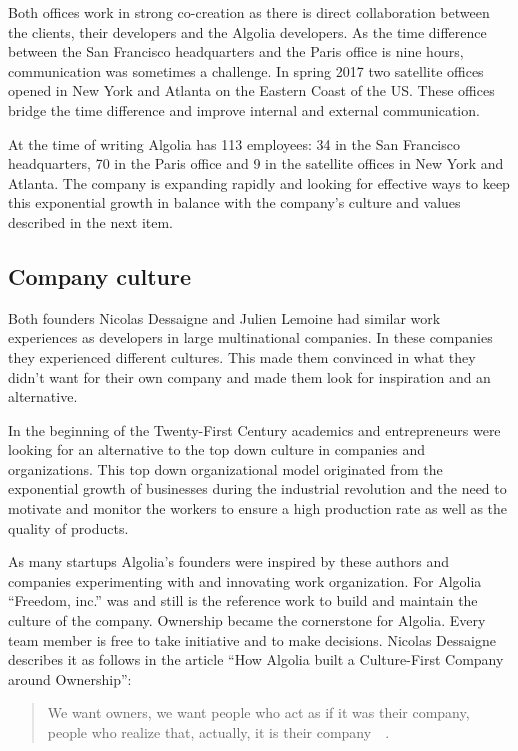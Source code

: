 Both offices work in strong co-creation as there is direct collaboration between the clients, their developers and the Algolia developers. As the time difference between the San Francisco headquarters and the Paris office is nine hours, communication was sometimes a challenge. In spring 2017 two satellite offices opened in New York and Atlanta on the Eastern Coast of the US. These offices bridge the time difference and improve internal and external communication.

At the time of writing Algolia has 113 employees: 34 in the San Francisco headquarters, 70 in the Paris office and 9 in the satellite offices in New York and Atlanta. The company is expanding rapidly and looking for effective ways to keep this exponential growth in balance with the company's culture and values described in the next item.

\subsection{Company culture}
\label{sub:company_culture}

Both founders Nicolas Dessaigne and Julien Lemoine had similar work experiences as developers in large multinational companies. In these companies they experienced different cultures. This made them convinced in what they didn't want for their own company and made them look for inspiration and an alternative.

In the beginning of the Twenty-First Century academics and entrepreneurs were looking for an alternative to the top down culture in companies and organizations. This top down organizational model originated from the exponential growth of businesses during the industrial revolution and the need to motivate and monitor the workers to ensure a high production rate as well as the quality of products.

As many startups Algolia's founders were inspired by these authors and companies experimenting with and innovating work organization. For Algolia ``Freedom, inc.''\cite{freedom-inc} was and still is the reference work to build and maintain the culture of the company. Ownership became the cornerstone for Algolia. Every team member is free to take initiative and to make decisions. Nicolas Dessaigne describes it as follows in the article ``How Algolia built a Culture-First Company around Ownership'':

\begin{quote}
We want owners, we want people who act as if it was their company, people who realize that, actually, it is their company~\cite{culture-first}~.
\end{quote}

